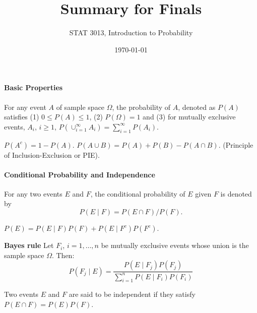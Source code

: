 \documentclass[10pt,twocolumn]{article}
\numberwithin{equation}{section}
\begin{document}

\title{Summary for Finals} 
\author{STAT 3013, Introduction to Probability}
\date{\today}
\maketitle
\paragraph{Basic Properties}
\ben
\item For any event $A$ of sample space $\Omega$, the probability of $A$, denoted as $P(A)$ satisfies (1) $0 \le P(A) \le 1$, (2) $P(\Omega) = 1$ and (3) for mutually exclusive events, $A_i$, $i \ge 1$, $P(\cup_{i=1}^{\infty} A_i) = \sum_{i=1}^{\infty} P(A_i)$. 
\item $P(A^c) = 1 - P(A)$. $P(A \cup B) = P(A) + P(B) - P(A \cap B)$. (Principle of Inclusion-Exclusion or PIE). 
\een
\paragraph{Conditional Probability and Independence}
\ben 
\item For any two events $E$ and $F$, the conditional probability of $E$ given $F$ is denoted by 
\[
P(E \mid F) = P(E \cap F)/P(F).
\]
\item $P(E) = P(E \mid F) P(F) + P(E \mid F^c) P(F^c)$.
\item \textbf{Bayes rule} Let $F_i$, $i = 1, \ldots, n$ be mutually exclusive events whose union is the sample space $\Omega$. Then:
\[
P(F_j \mid E) = \frac{P(E \mid F_j)P(F_j)}{\sum_{i=1}^{n} P(E \mid F_i)P(F_i)}
\]
\item Two events $E$ and $F$ are said to be independent if they satisfy $P(E \cap F) = P(E)P(F)$. 
\een
\end{document}
